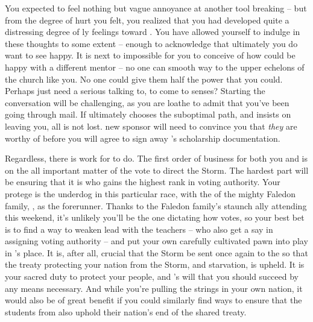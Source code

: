 \documentclass[char]{GL2020}
\begin{document}
You expected to feel nothing but vague annoyance at another tool breaking -- but from the degree of hurt you felt, you realized that you had developed quite a distressing degree of \cAntiChup{\parent}ly feelings toward \cScholarship{\them}. You have allowed yourself to indulge in these thoughts to some extent -- enough to acknowledge that ultimately you do want to see \cScholarship{} happy. It is next to impossible for you to conceive of how \cScholarship{\they} could be happy with a different mentor -- no one can smooth \cScholarship{\their} way to the upper echelons of the church like you. No one could give them half the power that you could. Perhaps \cScholarship{\they} just need\cScholarship{\plural} a serious talking to, to come to \cScholarship{\their} senses? Starting the conversation will be challenging, as you are loathe to admit that you’ve been going through \cScholarship{\their} mail. If ultimately \cScholarship{} chooses the suboptimal path, and insists on leaving you, all is not lost. \cScholarship{\Their} new sponsor will need to convince you that \emph{they} are worthy of \cScholarship{} before you will agree to sign away \cScholarship{}’s scholarship documentation.

Regardless, there is work for \cScholarship{} to do. The first order of business for both you and \cScholarship{\them} is on the all important matter of the vote to direct the Storm.  The hardest part will be ensuring that it is \cScholarship{} who gains the highest rank in voting authority. Your protege is the underdog in this particular race, with the \cHeir{\child} of the mighty Faledon family, \cHeir{}, as the forerunner. Thanks to the Faledon family’s staunch ally \cDiplomat{} attending this weekend, it’s unlikely you’ll be the one dictating how \cHeir{} votes, so your best bet is to find a way to weaken \cHeir{\their} lead with the teachers -- who also get a say in assigning voting authority -- and put your own carefully cultivated pawn into play in  \cHeir{}’s place. It is, after all, crucial that the Storm be sent once again to the \pShip{} so that the treaty protecting your nation from the Storm, and starvation, is upheld. It is your sacred duty to protect your people, and \cTechGod{}’s will that you should succeed by any means necessary. And while you're pulling the strings in your own nation, it would also be of great benefit if you could similarly find ways to ensure that the students from \pFarm{} also uphold their nation’s end of the shared treaty.
\end{document}
